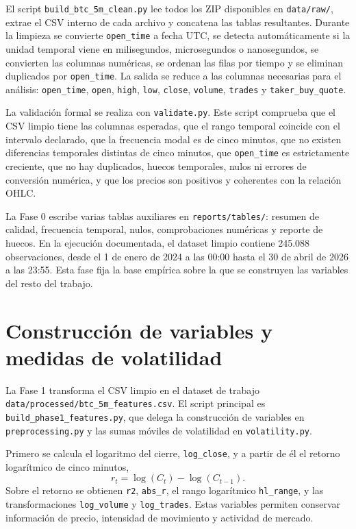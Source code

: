El script \texttt{build\_\allowbreak btc\_\allowbreak 5m\_\allowbreak clean.py} lee todos los ZIP disponibles en \texttt{data/\allowbreak raw/}, extrae el CSV interno de cada archivo y concatena las tablas resultantes. Durante la limpieza se convierte \texttt{open\_\allowbreak time} a fecha UTC, se detecta automáticamente si la unidad temporal viene en milisegundos, microsegundos o nanosegundos, se convierten las columnas numéricas, se ordenan las filas por tiempo y se eliminan duplicados por \texttt{open\_\allowbreak time}. La salida se reduce a las columnas necesarias para el análisis: \texttt{open\_\allowbreak time}, \texttt{open}, \texttt{high}, \texttt{low}, \texttt{close}, \texttt{volume}, \texttt{trades} y \texttt{taker\_\allowbreak buy\_\allowbreak quote}.

La validación formal se realiza con \texttt{validate.py}. Este script comprueba que el CSV limpio tiene las columnas esperadas, que el rango temporal coincide con el intervalo declarado, que la frecuencia modal es de cinco minutos, que no existen diferencias temporales distintas de cinco minutos, que \texttt{open\_\allowbreak time} es estrictamente creciente, que no hay duplicados, huecos temporales, nulos ni errores de conversión numérica, y que los precios son positivos y coherentes con la relación OHLC.

La Fase 0 escribe varias tablas auxiliares en \texttt{reports/\allowbreak tables/}: resumen de calidad, frecuencia temporal, nulos, comprobaciones numéricas y reporte de huecos. En la ejecución documentada, el dataset limpio contiene 245.088 observaciones, desde el 1 de enero de 2024 a las 00:00 hasta el 30 de abril de 2026 a las 23:55. Esta fase fija la base empírica sobre la que se construyen las variables del resto del trabajo.

\section{Construcción de variables y medidas de volatilidad}\label{sec:construccion-variables}

La Fase 1 transforma el CSV limpio en el dataset de trabajo \texttt{data/\allowbreak processed/\allowbreak btc\_\allowbreak 5m\_\allowbreak features.csv}. El script principal es \texttt{build\_\allowbreak phase1\_\allowbreak features.py}, que delega la construcción de variables en \texttt{preprocessing.py} y las sumas móviles de volatilidad en \texttt{volatility.py}.

Primero se calcula el logaritmo del cierre, \texttt{log\_\allowbreak close}, y a partir de él el retorno logarítmico de cinco minutos,
\[
    r_t = \log(C_t) - \log(C_{t-1}).
\]
Sobre el retorno se obtienen \texttt{r2}, \texttt{abs\_\allowbreak r}, el rango logarítmico \texttt{hl\_\allowbreak range}, y las transformaciones \texttt{log\_\allowbreak volume} y \texttt{log\_\allowbreak trades}. Estas variables permiten conservar información de precio, intensidad de movimiento y actividad de mercado.

